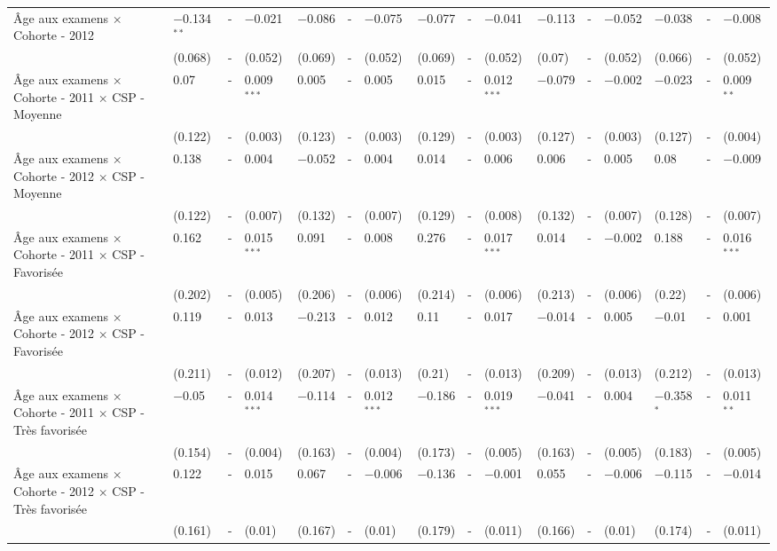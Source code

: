\documentclass[
]{book}
\begin{document}
\begin{ThreePartTable}
\begin{longtable}[t]{llllllllllllllll}
Âge aux examens $\times$ Cohorte - 2012 & $-$0.134$^{**}$ & - & $-$0.021 & $-$0.086 & - & $-$0.075 & $-$0.077 & - & $-$0.041 & $-$0.113 & - & $-$0.052 & $-$0.038 & - & $-$0.008\\
 & (0.068) & - & (0.052) & (0.069) & - & (0.052) & (0.069) & - & (0.052) & (0.07) & - & (0.052) & (0.066) & - & (0.052)\\
Âge aux examens $\times$ Cohorte - 2011 $\times$ CSP - Moyenne & 0.07 & - & 0.009$^{***}$ & 0.005 & - & 0.005 & 0.015 & - & 0.012$^{***}$ & $-$0.079 & - & $-$0.002 & $-$0.023 & - & 0.009$^{**}$\\
 & (0.122) & - & (0.003) & (0.123) & - & (0.003) & (0.129) & - & (0.003) & (0.127) & - & (0.003) & (0.127) & - & (0.004)\\
Âge aux examens $\times$ Cohorte - 2012 $\times$ CSP - Moyenne & 0.138 & - & 0.004 & $-$0.052 & - & 0.004 & 0.014 & - & 0.006 & 0.006 & - & 0.005 & 0.08 & - & $-$0.009\\
 & (0.122) & - & (0.007) & (0.132) & - & (0.007) & (0.129) & - & (0.008) & (0.132) & - & (0.007) & (0.128) & - & (0.007)\\
Âge aux examens $\times$ Cohorte - 2011 $\times$ CSP - Favorisée & 0.162 & - & 0.015$^{***}$ & 0.091 & - & 0.008 & 0.276 & - & 0.017$^{***}$ & 0.014 & - & $-$0.002 & 0.188 & - & 0.016$^{***}$\\
 & (0.202) & - & (0.005) & (0.206) & - & (0.006) & (0.214) & - & (0.006) & (0.213) & - & (0.006) & (0.22) & - & (0.006)\\
Âge aux examens $\times$ Cohorte - 2012 $\times$ CSP - Favorisée & 0.119 & - & 0.013 & $-$0.213 & - & 0.012 & 0.11 & - & 0.017 & $-$0.014 & - & 0.005 & $-$0.01 & - & 0.001\\
 & (0.211) & - & (0.012) & (0.207) & - & (0.013) & (0.21) & - & (0.013) & (0.209) & - & (0.013) & (0.212) & - & (0.013)\\
Âge aux examens $\times$ Cohorte - 2011 $\times$ CSP - Très favorisée & $-$0.05 & - & 0.014$^{***}$ & $-$0.114 & - & 0.012$^{***}$ & $-$0.186 & - & 0.019$^{***}$ & $-$0.041 & - & 0.004 & $-$0.358$^{*}$ & - & 0.011$^{**}$\\
 & (0.154) & - & (0.004) & (0.163) & - & (0.004) & (0.173) & - & (0.005) & (0.163) & - & (0.005) & (0.183) & - & (0.005)\\
Âge aux examens $\times$ Cohorte - 2012 $\times$ CSP - Très favorisée & 0.122 & - & 0.015 & 0.067 & - & $-$0.006 & $-$0.136 & - & $-$0.001 & 0.055 & - & $-$0.006 & $-$0.115 & - & $-$0.014\\
 & (0.161) & - & (0.01) & (0.167) & - & (0.01) & (0.179) & - & (0.011) & (0.166) & - & (0.01) & (0.174) & - & (0.011)\\

\end{longtable}
\end{ThreePartTable}
\end{document}

